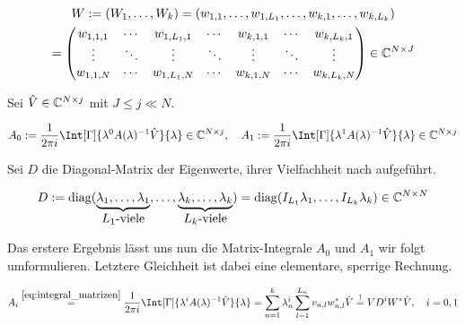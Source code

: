 \begin{multline*}
    W
    :=
    (W_1, \dots, W_k)
    =
    (w_{1, 1}, \dots, w_{1, L_1}, \dots, w_{k, 1}, \dots, w_{k, L_k}) \\
    =
    \begin{pmatrix}
        w_{1, 1, 1} & \cdots & w_{1, L_1, 1} & \cdots & w_{k, 1, 1} & \cdots & w_{k, L_k, 1} \\
        \vdots      & \ddots & \vdots        & \ddots & \vdots      & \ddots & \vdots        \\
        w_{1, 1, N} & \cdots & w_{1, L_1, N} & \cdots & w_{k, 1, N} & \cdots & w_{k, L_k, N}
    \end{pmatrix}
    \in
    \mathbb{C}^{N \times J}
\end{multline*}

Sei $\hat V \in \mathbb{C}^{N \times j}$ mit $J \leq j \ll N$.

\begin{align} \label{eq:integral_matrizen}
    A_0 := \frac{1}{2 \pi i} \Int[\Gamma]{\lambda^0 A(\lambda)^{-1} \hat V}{\lambda} \in \C^{N \times j},
    \quad
    A_1 := \frac{1}{2 \pi i} \Int[\Gamma]{\lambda^1 A(\lambda)^{-1} \hat V}{\lambda} \in \C^{N \times j}
\end{align}

Sei $D$ die Diagonal-Matrix der Eigenwerte, ihrer Vielfachheit nach aufgeführt.

\begin{align*}
    D
    :=
    \operatorname{diag}
    (
        \underbrace
        {
            \lambda_1, \dots, \lambda_1
        }_{
            \displaystyle
            \text{$L_1$-viele}
        },
        \dots,
        \underbrace
        {
            \lambda_k, \dots, \lambda_k
        }_{
            \displaystyle
            \text{$L_k$-viele}
        }
    )
    =
    \operatorname{diag}(I_{L_1} \lambda_1, \dots, I_{L_k} \lambda_k)
    \in
    \mathbb{C}^{N \times N}
\end{align*}

Das erstere Ergebnis lässt uns nun die Matrix-Integrale $A_0$ und $A_1$ wir folgt umformulieren.
Letztere Gleichheit ist dabei eine elementare, sperrige Rechnung.

\begin{align} \label{eq:integral_matrizen_resultat_compact}
    A_i
    \stackrel{\eqref{eq:integral_matrizen}}{=}
    \frac{1}{2 \pi i}
    \Int[\Gamma]
    {
        \lambda^i
        A(\lambda)^{-1}
        \hat V
    }{\lambda}
    =
    \sum_{n=1}^k
        \lambda_n^i
        \sum_{l=1}^{L_n}
            v_{n, l} w_{n, l}^\ast
    \hat V
    \stackrel{!}{=}
    V D^i W^\ast \hat V,
    \quad
    i = 0, 1
\end{align}

